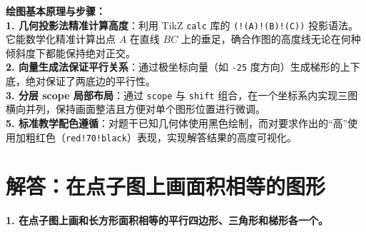 \documentclass[12pt, a4paper]{ctexrep}
\begin{document}
\vspace{0.6cm}

{\small\color{blue!70!black}
\textbf{绘图基本原理与步骤：}\\
\textbf{1. 几何投影法精准计算高度}：利用 TikZ \texttt{calc} 库的 \texttt{(!(A)!(B)!(C))} 投影语法。它能数学化精准计算出点 $A$ 在直线 $BC$ 上的垂足，确合作图的高度线无论在何种倾斜度下都能保持绝对正交。\\
\textbf{2. 向量生成法保证平行关系}：通过极坐标向量（如 \texttt{-25} 度方向）生成梯形的上下底，绝对保证了两底边的平行性。\\
\textbf{3. 分层 scope 局部布局}：通过 \texttt{scope} 与 \texttt{shift} 组合，在一个坐标系内实现三图横向并列，保持画面整洁且方便对单个图形位置进行微调。\\
\textbf{5. 标准教学配色遵循}：对题干已知几何体使用黑色绘制，而对要求作出的“高”使用加粗红色（\texttt{red!70!black}）表现，实现解答结果的高度可视化。
}

\newpage

\section{解答：在点子图上画面积相等的图形}

\vspace{0.4cm}

\noindent\textbf{1. 在点子图上画和长方形面积相等的平行四边形、三角形和梯形各一个。}

\vspace{1.2cm}
\end{document}
